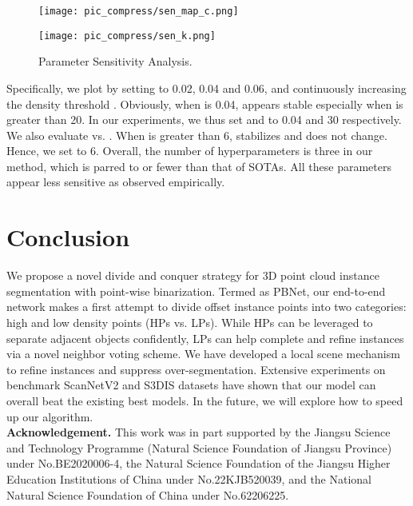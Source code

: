 \documentclass[10pt,twocolumn,letterpaper]{article}
\begin{document}
\begin{figure}[h]
	\centering 
	\begin{minipage}{0.44\linewidth} 
\centerline{\texttt{[image:  pic\_compress/sen\_map\_c.png]}}
\end{minipage}
	\hspace{0.06\linewidth}
	\begin{minipage}{0.44\linewidth} 
\centerline{\texttt{[image:  pic\_compress/sen\_k.png]}}
\end{minipage}
	\caption{Parameter Sensitivity Analysis.}
	\label{fig:sen}
\end{figure}


Specifically, we plot  by  setting  to 0.02, 0.04 and 0.06, and continuously increasing the density threshold . Obviously, when  is 0.04,   appears stable especially when  is greater than 20. In our experiments, we thus set  and  to 0.04 and 30 respectively. We also  evaluate  vs. . When  is greater than 6,  stabilizes and does not change. Hence, we set  to 6. Overall, the number of hyperparameters is three in our method, which is parred to or fewer than that of SOTAs. All these parameters appear less sensitive as  observed empirically.


\section{Conclusion}
We propose a novel divide and conquer strategy for 3D point cloud instance segmentation with point-wise binarization. Termed as PBNet, our end-to-end network makes a first attempt to divide offset instance points into two categories: high and low density points (HPs vs. LPs). While HPs can be leveraged to separate adjacent objects confidently, LPs can help complete and refine instances via a novel neighbor voting scheme. We have  developed a local scene mechanism to refine instances and suppress over-segmentation. Extensive  experiments on benchmark ScanNetV2 and S3DIS datasets have shown that our model can  overall beat  the existing best models. In the future, we will explore how to speed up our algorithm.
\\

\noindent\textbf{Acknowledgement.} This work was in part supported by the Jiangsu Science and Technology Programme (Natural Science Foundation of Jiangsu Province) under No.BE2020006-4, the Natural Science Foundation of the Jiangsu Higher Education Institutions of China under No.22KJB520039, and the National Natural Science Foundation of China under No.62206225.


{\small


}
\end{document}

